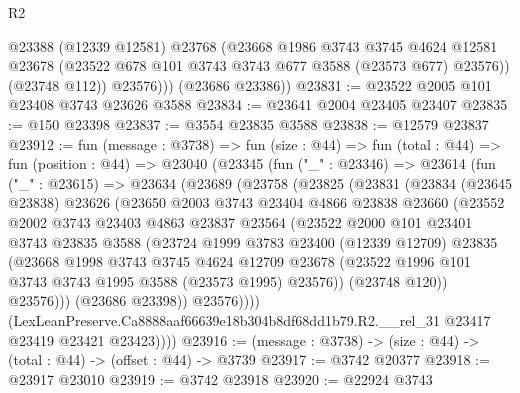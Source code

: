 \begin{lexlean}{R2}
\begin{coremodule}
              @23388
              (@12339 @12581)
              @23768
              (@23668
                @1986
                @3743
                @3745
                @4624
                @12581
                @23678
                (@23522 @678 @101 @3743 @3743 @677 @3588 (@23573 @677) @23576))
              (@23748 @112))
            @23576)))
      (@23686 @23386))
@23831 := @23522 @2005 @101 @23408 @3743 @23626 @3588
@23834 := @23641 @2004 @23405 @23407
@23835 := @150 @23398
@23837 := @3554 @23835 @3588
@23838 := @12579 @23837
@23912 := fun (message : @3738) =>
  fun (size : @44) =>
  fun (total : @44) =>
  fun (position : @44) =>
  @23040
    (@23345
      (fun ("_" : @23346) =>
      @23614
        (fun ("_" : @23615) =>
        @23634
          (@23689
            (@23758
              (@23825
                (@23831
                  (@23834
                    (@23645 @23838)
                    @23626
                    (@23650
                      @2003
                      @3743
                      @23404
                      @4866
                      @23838
                      @23660
                      (@23552
                        @2002
                        @3743
                        @23403
                        @4863
                        @23837
                        @23564
                        (@23522
                          @2000
                          @101
                          @23401
                          @3743
                          @23835
                          @3588
                          (@23724
                            @1999
                            @3783
                            @23400
                            (@12339 @12709)
                            @23835
                            (@23668
                              @1998
                              @3743
                              @3745
                              @4624
                              @12709
                              @23678
                              (@23522 @1996 @101 @3743 @3743 @1995 @3588 (@23573 @1995) @23576))
                            (@23748 @120))
                          @23576)))
                    (@23686 @23398))
                  @23576))))
          (LexLeanPreserve.Ca8888aaf66639e18b304b8df68dd1b79.R2.__rel_31
            @23417
            @23419
            @23421
            @23423))))
@23916 := (message : @3738) -> (size : @44) -> (total : @44) -> (offset : @44) -> @3739
@23917 := @3742 @20377
@23918 := @23917 @23010
@23919 := @3742 @23918
@23920 := @22924 @3743

\end{coremodule}
\end{lexlean}
